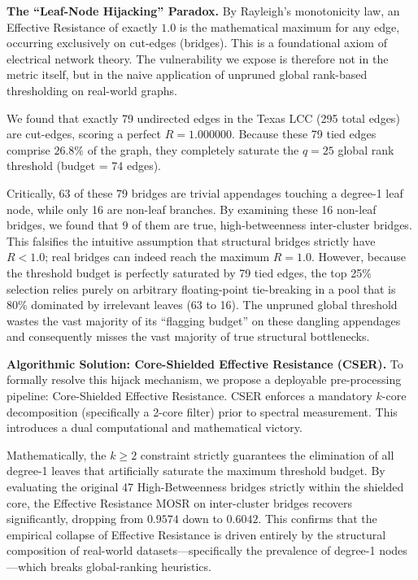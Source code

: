 \documentclass[10pt]{article} %
\begin{document}
\textbf{The ``Leaf-Node Hijacking'' Paradox.} 
By Rayleigh's monotonicity law, an Effective Resistance of exactly $1.0$ is the mathematical maximum for any edge, occurring exclusively on cut-edges (bridges). This is a foundational axiom of electrical network theory. The vulnerability we expose is therefore not in the metric itself, but in the naive application of unpruned global rank-based thresholding on real-world graphs.

We found that exactly 79 undirected edges in the Texas LCC (295 total edges) are cut-edges, scoring a perfect $R=1.000000$. Because these 79 tied edges comprise $26.8\%$ of the graph, they completely saturate the $q=25$ global rank threshold (budget = 74 edges). 

Critically, 63 of these 79 bridges are trivial appendages touching a degree-1 leaf node, while only 16 are non-leaf branches. By examining these 16 non-leaf bridges, we found that 9 of them are true, high-betweenness inter-cluster bridges. This falsifies the intuitive assumption that structural bridges strictly have $R < 1.0$; real bridges can indeed reach the maximum $R=1.0$. However, because the threshold budget is perfectly saturated by 79 tied edges, the top 25\% selection relies purely on arbitrary floating-point tie-breaking in a pool that is 80\% dominated by irrelevant leaves (63 to 16). The unpruned global threshold wastes the vast majority of its ``flagging budget'' on these dangling appendages and consequently misses the vast majority of true structural bottlenecks. 

\textbf{Algorithmic Solution: Core-Shielded Effective Resistance (CSER).}
To formally resolve this hijack mechanism, we propose a deployable pre-processing pipeline: Core-Shielded Effective Resistance. CSER enforces a mandatory $k$-core decomposition (specifically a 2-core filter) prior to spectral measurement. This introduces a dual computational and mathematical victory. 

Mathematically, the $k \ge 2$ constraint strictly guarantees the elimination of all degree-1 leaves that artificially saturate the maximum threshold budget. By evaluating the original 47 High-Betweenness bridges strictly within the shielded core, the Effective Resistance MOSR on inter-cluster bridges recovers significantly, dropping from $0.9574$ down to $0.6042$. This confirms that the empirical collapse of Effective Resistance is driven entirely by the structural composition of real-world datasets---specifically the prevalence of degree-1 nodes---which breaks global-ranking heuristics.
\end{document}
